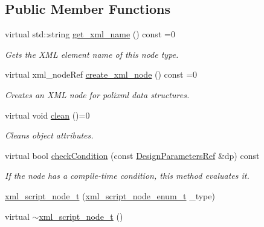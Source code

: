 \subsection*{Public Member Functions}
\begin{DoxyCompactItemize}
\item 
virtual std\+::string \hyperlink{classxml__script__node__t_af5815fab8924e5e4f47ba1b7266b6cb8}{get\+\_\+xml\+\_\+name} () const =0
\begin{DoxyCompactList}\small\item\em Gets the X\+ML element name of this node type. \end{DoxyCompactList}\item 
virtual xml\+\_\+node\+Ref \hyperlink{classxml__script__node__t_adaf9c51a079c4617f3845c6133eb477f}{create\+\_\+xml\+\_\+node} () const =0
\begin{DoxyCompactList}\small\item\em Creates an X\+ML node for polixml data structures. \end{DoxyCompactList}\item 
virtual void \hyperlink{classxml__script__node__t_a2be778f2caef531c55b36c2bf2c996e2}{clean} ()=0
\begin{DoxyCompactList}\small\item\em Cleans object attributes. \end{DoxyCompactList}\item 
virtual bool \hyperlink{classxml__script__node__t_a13fbe7caa7bed64ab3cc25d51392523d}{check\+Condition} (const \hyperlink{DesignParameters_8hpp_ae36bb1c4c9150d0eeecfe1f96f42d157}{Design\+Parameters\+Ref} \&dp) const
\begin{DoxyCompactList}\small\item\em If the node has a compile-\/time condition, this method evaluates it. \end{DoxyCompactList}\item 
\hyperlink{classxml__script__node__t_aace8091f12771c1bb40433e1222a9305}{xml\+\_\+script\+\_\+node\+\_\+t} (\hyperlink{xml__script__command_8hpp_a3f764b80e60a34ae77719e7f4616a59b}{xml\+\_\+script\+\_\+node\+\_\+enum\+\_\+t} \+\_\+type)
\item 
virtual \hyperlink{classxml__script__node__t_ad820fc2326bb87dbfb3cb799cc5a61d1}{$\sim$xml\+\_\+script\+\_\+node\+\_\+t} ()
\end{DoxyCompactItemize}
